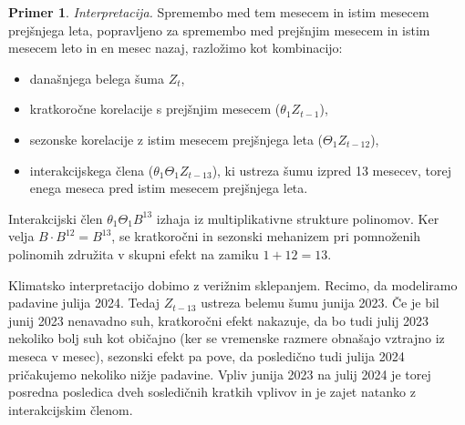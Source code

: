 \documentclass[11pt]{amsart}
\theoremstyle{definition}
\newtheorem{primer}[definicija]{Primer}
\theoremstyle{plain}
\begin{document}
\begin{primer}
    \emph{Interpretacija.} Spremembo med tem mesecem in istim mesecem prejšnjega leta, 
    popravljeno za spremembo med prejšnjim mesecem in istim mesecem leto in en mesec nazaj, 
    razložimo kot kombinacijo:
    \begin{itemize}
        \item današnjega belega šuma $Z_t$,
        \item kratkoročne korelacije s prejšnjim mesecem ($\theta_1 Z_{t-1}$),
        \item sezonske korelacije z istim mesecem prejšnjega leta ($\Theta_1 Z_{t-12}$),
        \item interakcijskega člena ($\theta_1 \Theta_1 Z_{t-13}$), ki ustreza šumu izpred 
              13 mesecev, torej enega meseca pred istim mesecem prejšnjega leta.
    \end{itemize}
    Interakcijski člen $\theta_1 \Theta_1 B^{13}$ izhaja iz multiplikativne 
    strukture polinomov. Ker velja $B \cdot B^{12} = B^{13}$, se kratkoročni in sezonski mehanizem 
    pri pomnoženih polinomih združita v skupni efekt na zamiku $1 + 12 = 13$. 
    
    Klimatsko interpretacijo dobimo z verižnim sklepanjem. Recimo, da modeliramo padavine 
    julija 2024. Tedaj $Z_{t-13}$ ustreza belemu šumu junija 2023. Če je bil junij 2023 nenavadno 
    suh, kratkoročni efekt nakazuje, da bo tudi julij 2023 nekoliko bolj suh kot običajno (ker 
    se vremenske razmere obnašajo vztrajno iz meseca v mesec), sezonski efekt pa pove, da 
    posledično tudi julija 2024 pričakujemo nekoliko nižje padavine. Vpliv junija 2023 na 
    julij 2024 je torej posredna posledica dveh sosledičnih kratkih vplivov in je zajet 
    natanko z interakcijskim členom.
\end{primer}
\end{document}
